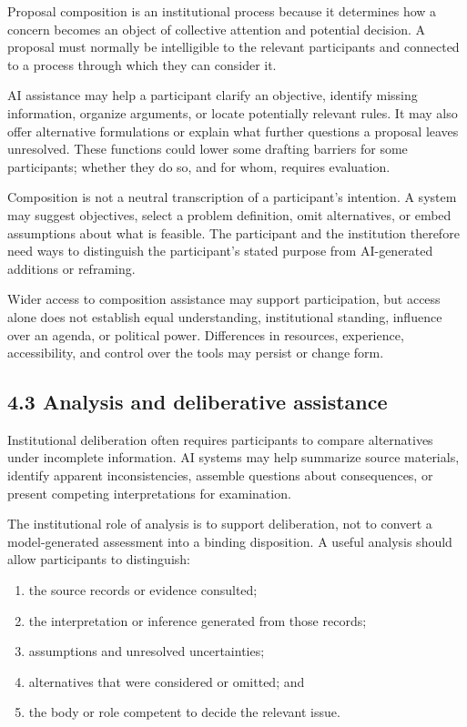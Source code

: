 \documentclass[
  10pt,
]{article}
\providecommand{\tightlist}{%
  \setlength{\itemsep}{0pt}\setlength{\parskip}{0pt}}
\begin{document}
Proposal composition is an institutional process because it determines
how a concern becomes an object of collective attention and potential
decision. A proposal must normally be intelligible to the relevant
participants and connected to a process through which they can consider
it.

AI assistance may help a participant clarify an objective, identify
missing information, organize arguments, or locate potentially relevant
rules. It may also offer alternative formulations or explain what
further questions a proposal leaves unresolved. These functions could
lower some drafting barriers for some participants; whether they do so,
and for whom, requires evaluation.

Composition is not a neutral transcription of a participant's intention.
A system may suggest objectives, select a problem definition, omit
alternatives, or embed assumptions about what is feasible. The
participant and the institution therefore need ways to distinguish the
participant's stated purpose from AI-generated additions or reframing.

Wider access to composition assistance may support participation, but
access alone does not establish equal understanding, institutional
standing, influence over an agenda, or political power. Differences in
resources, experience, accessibility, and control over the tools may
persist or change form.

\subsection{4.3 Analysis and deliberative
assistance}\label{analysis-and-deliberative-assistance}

Institutional deliberation often requires participants to compare
alternatives under incomplete information. AI systems may help summarize
source materials, identify apparent inconsistencies, assemble questions
about consequences, or present competing interpretations for
examination.

The institutional role of analysis is to support deliberation, not to
convert a model-generated assessment into a binding disposition. A
useful analysis should allow participants to distinguish:

\begin{enumerate}
\def\labelenumi{\arabic{enumi}.}
\tightlist
\item
  the source records or evidence consulted;
\item
  the interpretation or inference generated from those records;
\item
  assumptions and unresolved uncertainties;
\item
  alternatives that were considered or omitted; and
\item
  the body or role competent to decide the relevant issue.
\end{enumerate}
\end{document}
